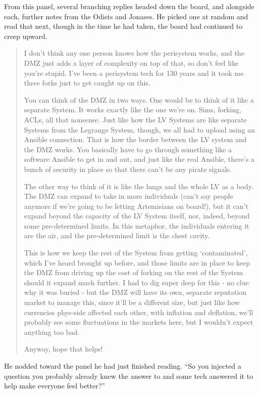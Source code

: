 From this panel, several branching replies headed down the board, and alongside each, further notes from the Odists and Jonases. He picked one at random and read that next, though in the time he had taken, the board had continued to creep upward.

\begin{quote}
I don't think any one person knows how the perisystem works, and the DMZ just adds a layer of complexity on top of that, so don't feel like you're stupid. I've been a perisystem tech for 130 years and it took me three forks just to get caught up on this.

You can think of the DMZ in two ways. One would be to think of it like a separate System. It works exactly like the one we're on. Sims, forking, ACLs, all that nonsense. Just like how the LV Systems are like separate Systems from the Legrange System, though, we all had to upload using an Ansible connection. That is how the border between the LV system and the DMZ works. You basically have to go through something like a software Ansible to get in and out, and just like the real Ansible, there's a bunch of security in place so that there can't be any pirate signals.

The other way to think of it is like the lungs and the whole LV as a body. The DMZ can expand to take in more individuals (can't say people anymore if we're going to be letting Artemisians on board!), but it can't expand beyond the capacity of the LV System itself, nor, indeed, beyond some pre-determined limits. In this metaphor, the individuals entering it are the air, and the pre-determined limit is the chest cavity.

This is how we keep the rest of the System from getting `contaminated', which I've heard brought up before, and those limits are in place to keep the DMZ from driving up the cost of forking on the rest of the System should it expand much further. I had to dig super deep for this - no clue why it was buried - but the DMZ will have its own, separate reputation market to manage this, since it'll be a different size, but just like how currencies phys-side affected each other, with inflation and deflation, we'll probably see some fluctuations in the markets here, but I wouldn't expect anything too bad.

Anyway, hope that helps!
\end{quote}

He nodded toward the panel he had just finished reading. ``So you injected a question you probably already knew the answer to and some tech answered it to help make everyone feel better?''


